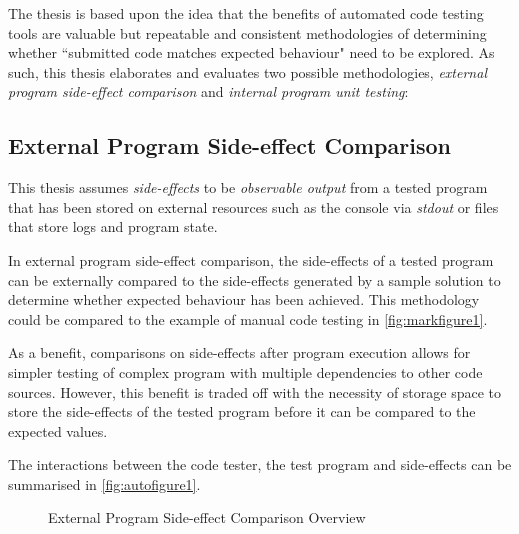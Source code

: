 \documentclass[hidelinks]{report}
\begin{document}
The thesis is based upon the idea that the benefits of automated code testing tools are valuable but repeatable and consistent methodologies of determining whether ``submitted code matches expected behaviour" need to be explored. As such, this thesis elaborates and evaluates two possible methodologies, \textit{external program side-effect comparison} and \textit{internal program unit testing}: 

\subsection{External Program Side-effect Comparison}

This thesis assumes \textit{side-effects} to be \textit{observable output} from a tested program that has been stored on external resources such as the console via \textit{stdout} or files that store logs and program state.

In external program side-effect comparison, the side-effects of a tested program can be externally compared to the side-effects generated by a sample solution to determine whether expected behaviour has been achieved. This methodology could be compared to the example of manual code testing in \autoref{fig:markfigure1}.

As a benefit, comparisons on side-effects after program execution allows for simpler testing of complex program with multiple dependencies to other code sources. However, this benefit is traded off with the necessity of storage space to store the side-effects of the tested program before it can be compared to the expected values.

The interactions between the code tester, the test program and side-effects can be summarised in \autoref{fig:autofigure1}.

\begin{figure}[h]
	\centering
	\caption{External Program Side-effect Comparison Overview}
	\label{fig:autofigure1}
\end{figure}
\end{document}
